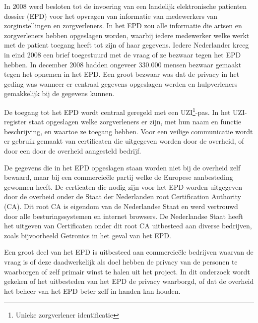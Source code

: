 In 2008 werd besloten tot de invoering van een landelijk elektronische patienten dossier (EPD) voor het opvragen van informatie van medewerkers van zorginstellingen en zorgverleners. In het EPD zou alle informatie die artsen en zorgverleners hebben opgeslagen worden, waarbij iedere medewerker welke werkt met de patient toegang heeft tot zijn of haar gegevens. Iedere Nederlander kreeg in eind 2008 een brief toegestuurd met de vraag of ze bezwaar tegen het EPD hebben. In december 2008 hadden ongeveer 330.000 mensen bezwaar gemaakt tegen het opnemen in het EPD\cite{bib.minvws.epdbezwaar}. Een groot bezwaar was dat de privacy in het geding was wanneer er centraal gegevens opgeslagen werden en hulpverleners gemakkelijk bij de gegevens kunnen.

De toegang tot het EPD wordt centraal geregeld met een UZI\footnote{Unieke zorgverlener identificatie}-pas. In het UZI-register staat opgeslagen welke zorgverleners er zijn, met hun naam en functie beschrijving, en waartoe ze toegang hebben. Voor een veilige communicatie wordt er gebruik gemaakt van certificaten die uitgegeven worden door de overheid, of door een door de overheid aangesteld bedrijf.

De gegevens die in het EPD opgeslagen staan worden niet bij de overheid zelf bewaard, maar bij een commercie\"{e}le partij welke de Europese aanbesteding gewonnen heeft. 
De certicaten die nodig zijn voor het EPD worden uitgegeven door de overheid onder de Staat der Nederlanden root Certification Authority (CA). Dit root CA is eigendom van de Nederlandse Staat en werd vertrouwd door alle besturingssystemen en internet browsers. De Nederlandse Staat heeft het uitgeven van Certificaten onder dit root CA uitbesteed aan diverse bedrijven, zoals bijvoorbeeld Getronics in het geval van het EPD\cite{bib.minvws.CPSUZI}.

Een groot deel van het EPD is uitbesteed aan commercie\"{e}le bedrijven waarvan de vraag is of deze daadwerkelijk als doel hebben de privacy van de personen te waarborgen of zelf primair winst te halen uit het project. In dit onderzoek wordt gekeken of het uitbesteden van het EPD de privacy waarborgd, of dat de overheid het beheer van het EPD beter zelf in handen kan houden.
